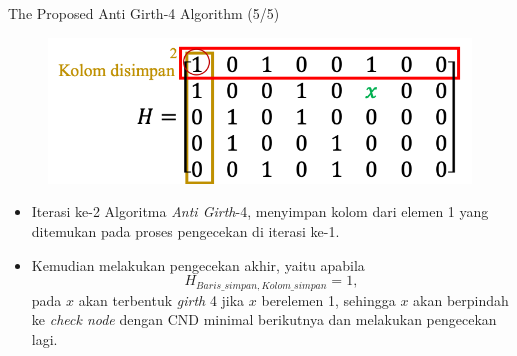 \documentclass[11pt, aspectratio=169]{beamer}
\begin{document}
\begin{frame}{The Proposed Anti Girth-4 Algorithm (5/5)}
	
	\centering 
	\begin{figure}
		\centering 
		\includegraphics[scale=0.65]{gambarafa/step6}
		\centering 
	\end{figure}
	\begin{itemize}
		\item[5.] Iterasi ke-2 Algoritma \textit{Anti Girth}-4, menyimpan kolom dari elemen 1 yang ditemukan pada proses pengecekan di iterasi ke-1. 
		\item [6] Kemudian melakukan pengecekan akhir, yaitu apabila
		\begin{equation}
			H_{Baris\_simpan, Kolom\_simpan}=1,
		\end{equation}
		pada $x$ akan terbentuk \textit{girth} 4 jika $x$ berelemen 1, sehingga $x$ akan berpindah ke \textit{check node} dengan CND minimal berikutnya dan melakukan pengecekan lagi.
	\end{itemize}
	
	
	
	
	
\end{frame}

%
%
\end{document}
